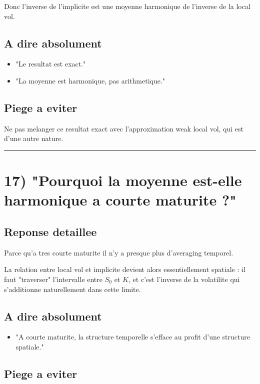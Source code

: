 \documentclass[11pt,a4paper]{article}
\begin{document}
Donc l'inverse de l'implicite est une moyenne harmonique de l'inverse de la local vol.

\subsection{A dire absolument}

\begin{itemize}
\item "Le resultat est exact."
\item "La moyenne est harmonique, pas arithmetique."
\end{itemize}

\subsection{Piege a eviter}

Ne pas melanger ce resultat exact avec l'approximation weak local vol, qui est d'une autre nature.

\bigskip\hrule\bigskip

\section{17) "Pourquoi la moyenne est-elle harmonique a courte maturite ?"}

\subsection{Reponse detaillee}

Parce qu'a tres courte maturite il n'y a presque plus d'averaging temporel.

La relation entre local vol et implicite devient alors essentiellement spatiale : il faut "traverser" l'intervalle entre \(S_0\) et \(K\), et c'est l'inverse de la volatilite qui s'additionne naturellement dans cette limite.

\subsection{A dire absolument}

\begin{itemize}
\item "A courte maturite, la structure temporelle s'efface au profit d'une structure spatiale."
\end{itemize}

\subsection{Piege a eviter}
\end{document}
